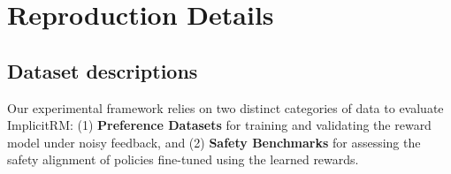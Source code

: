 \documentclass[]{arxiv_singlecolumn}
\theoremstyle{plain}
\theoremstyle{definition}
\theoremstyle{remark}
\begin{document}
    
    
    


\section{Reproduction Details}\label{sec:appendix_repro}
\subsection{Dataset descriptions}\label{sec:dataset}
Our experimental framework relies on two distinct categories of data to evaluate ImplicitRM: (1) \textbf{Preference Datasets} for training and validating the reward model under noisy feedback, and (2) \textbf{Safety Benchmarks} for assessing the safety alignment of policies fine-tuned using the learned rewards.
\end{document}
